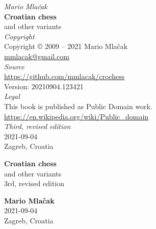 \documentclass[a5paper,12pt]{book} %
\begin{document}
\thispagestyle{empty}
\vspace*{0.05\textheight}
\begin{center}
    \emph{Mario Mlačak} \\
    \textbf{Croatian chess} \\
    and other variants \\ [2.0em]

    \emph{Copyright} \\
    Copyright \copyright \hspace{0.2ex} 2009 -- 2021 Mario Mlačak \\
    \href{mailto:mmlacak@gmail.com}{mmlacak@gmail.com} \\ [2.0em]

    \emph{Source} \\
    \href{https://github.com/mmlacak/crochess}{https://github.com/mmlacak/crochess} \\
    Version: 20210904.123421 \\ [2.0em] %

    \emph{Legal} \\
    This book is published as Public Domain work. \\
    \href{https://en.wikipedia.org/wiki/Public\_domain}{https://en.wikipedia.org/wiki/Public\_domain} \\ [2.0em]

    \emph{Third, revised edition} \\
    2021-09-04 \\ %
    Zagreb, Croatia

    \vfill
    \LaTeXe
    \vspace{0.05\textheight}
\end{center}
\clearpage %

\thispagestyle{empty}
\vspace*{0.2\textheight}
\begin{center}
    \textbf{\Large{Croatian chess}} \\ [1.0em]
    \large{and other variants} \\ [1.0em]
    \small{3rd, revised edition} \\ [2.0cm]
    \vspace*{0.2\textheight}

    \textbf{\large{Mario Mlačak}} \\ [1.0em]
    \small{2021-09-04} \\ [0.5em] %
    \small{Zagreb, Croatia}
\end{center}
\clearpage %
\end{document}
